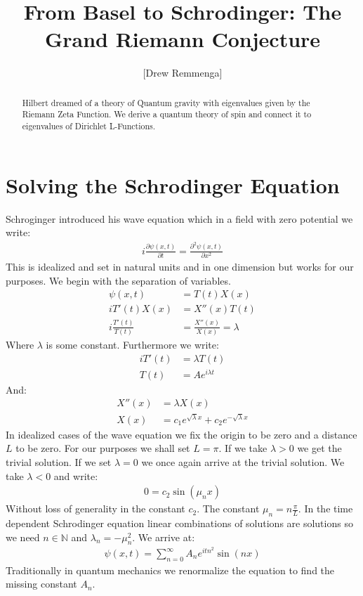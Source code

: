 \documentclass[10pt, oneside]{article}
\title{From Basel to Schrodinger: The Grand Riemann Conjecture}
\author{[Drew Remmenga]}
\newcommand{\N}{\mathbb{N}}
\begin{document}
\maketitle
\begin{abstract}
  Hilbert dreamed of a theory of Quantum gravity with eigenvalues given by the Riemann Zeta Function. We derive a quantum theory of spin and connect it to eigenvalues of Dirichlet L-Functions.
\end{abstract}
\section{Solving the Schrodinger Equation}
  Schroginger introduced his wave equation \cite{Islam1994} which in a field with zero potential we write:
  \begin{align}
      i \frac{\partial \psi (x,t)}{\partial t} = \frac{\partial^2 \psi (x,t)}{\partial x^2} \label{schrodinger}
  \end{align}
  This is idealized and set in natural units and in one dimension but works for our purposes.
  We begin with the separation of variables.
  \begin{align*}
      \psi (x,t) &= T(t)X(x) \\
      i T'(t) X(x) &= X''(x)T(t) \\
      i \frac{T'(t)}{T(t)} &= \frac{X''(x)}{X(x)} = \lambda
  \end{align*}
  Where $\lambda$ is some constant.
  Furthermore we write:
  \begin{align*}
      i T'(t) &= \lambda T(t) \\
      T(t) &= Ae^{i \lambda t}
  \end{align*}
  And:
  \begin{align*}
      X''(x) &= \lambda X(x) \\
      X(x) &= c_1 e^{\sqrt{\lambda} x} + c_2 e^{-\sqrt{\lambda} x}
  \end{align*}
  In idealized cases of the wave equation we fix the origin to be zero and a distance $L$ to be zero. For our purposes we shall set $L=\pi$.
  If we take $\lambda > 0$ we get the trivial solution. If we set $\lambda = 0$ we once again arrive at the trivial solution.
  We take $\lambda < 0$ and write:
  \begin{align*}
      0 = c_2 \sin (\mu_n x)
  \end{align*}
  Without loss of generality in the constant $c_2$. The constant $\mu_n = n \frac{\pi}{L}$.
  In the time dependent Schrodinger equation linear combinations of solutions are solutions so we need $n \in \N$ and $\lambda_n = -\mu_n^2$.
  We arrive at:
  \begin{align}
      \psi (x,t) = \sum_{n=0}^{\infty} A_n e^{i t n^2} \sin(n x) \label{eq:wave}
  \end{align}
  Traditionally in quantum mechanics we renormalize the equation to find the missing constant $A_n$.
  
\end{document}
